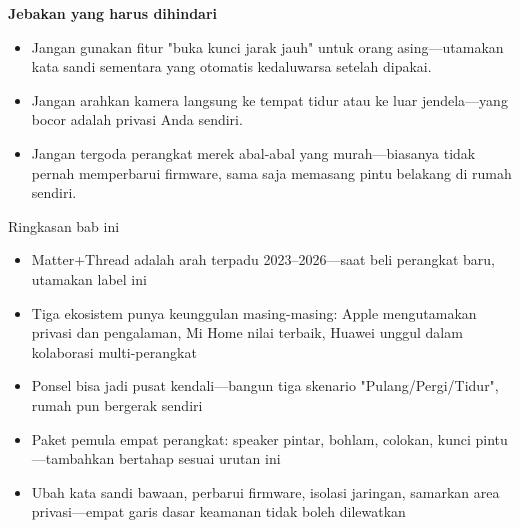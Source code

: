 \textbf{Jebakan yang harus dihindari}\par

\begin{itemize}
  \item Jangan gunakan fitur "buka kunci jarak jauh" untuk orang asing—utamakan kata sandi sementara yang otomatis kedaluwarsa setelah dipakai.
  \item Jangan arahkan kamera langsung ke tempat tidur atau ke luar jendela—yang bocor adalah privasi Anda sendiri.
  \item Jangan tergoda perangkat merek abal-abal yang murah—biasanya tidak pernah memperbarui firmware, sama saja memasang pintu belakang di rumah sendiri.
\end{itemize}

\begin{tcbsummary}{Ringkasan bab ini}
\begin{itemize}
  \item Matter+Thread adalah arah terpadu 2023–2026—saat beli perangkat baru, utamakan label ini
  \item Tiga ekosistem punya keunggulan masing-masing: Apple mengutamakan privasi dan pengalaman, Mi Home nilai terbaik, Huawei unggul dalam kolaborasi multi-perangkat
  \item Ponsel bisa jadi pusat kendali—bangun tiga skenario "Pulang/Pergi/Tidur", rumah pun bergerak sendiri
  \item Paket pemula empat perangkat: speaker pintar, bohlam, colokan, kunci pintu—tambahkan bertahap sesuai urutan ini
  \item Ubah kata sandi bawaan, perbarui firmware, isolasi jaringan, samarkan area privasi—empat garis dasar keamanan tidak boleh dilewatkan
\end{itemize}

\end{tcbsummary}
